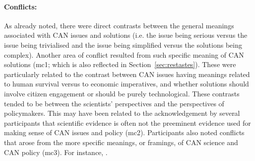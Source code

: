 \paragraph{Conflicts:}
As already noted, there were direct contrasts between the general meanings associated with CAN issues and solutions (i.e. the issue being serious versus the issue being trivialised and the issue being simplified versus the solutions being complex). Another area of conflict resulted from such specific meaning of CAN solutions (mc1; which is also reflected in Section~\ref{sec:restastes}). These were particularly related to the contrast between CAN issues having meanings related to human survival versus to economic imperatives, and whether solutions should involve citizen engagement or should be purely technological. These contrasts tended to be between the scientists' perspectives and the perspectives of policymakers. This may have been related to the acknowledgement by several participants that scientific evidence is often not the preeminent evidence used for making sense of CAN issues and policy (mc2). Participants also noted conflicts that arose from the more specific meanings, or framings, of CAN science and CAN policy (mc3). For instance, . 



